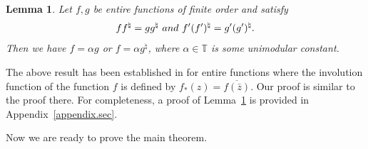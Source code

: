 \documentclass[11pt,oneside,reqno]{amsart}
\newtheorem{lem}[thm]{Lemma}
\numberwithin{equation}{section}
\def\T{ {\mathbb T} }
\begin{document}
\begin{lem}\label{pr.entire.lem}
{\rm Let $f,g $ be entire functions of  finite order  and satisfy
 \begin{equation}\label{f.lemma.eq}
 ff^\natural=gg^\natural{\rm \  and\ }f'(f')^\natural=g'(g')^\natural.\end{equation} Then we have
$f=\alpha g$ or $f=\alpha g^\natural$, where $\alpha \in \T$ is some unimodular constant.}
\end{lem}
 The above result has been established in \cite[Theorem 1]{Mcdonald} for entire functions where the involution function of the function $f$ is defined by $f_\ast(z)=\overline{f(\bar z)}$.  Our proof is similar to the proof there. For completeness, a proof of Lemma~\ref{pr.entire.lem} is provided in Appendix~\ref{appendix.sec}.

 

 \vskip0.06in

 Now we are ready to prove the main theorem. 

  \vskip0.06in
\end{document}

